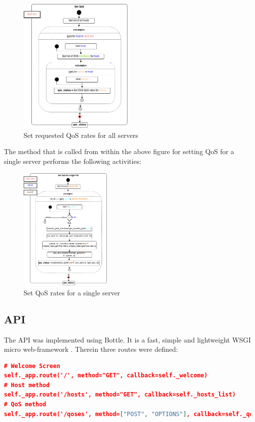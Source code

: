 \begin{figure}[H]
\centering

\includegraphics[width=0.5\textwidth]{images/implementation/cma_set_qos}

\caption{Set requested QoS rates for all servers}
\end{figure}

The method that is called from within the above figure for setting QoS for a single server performs the following activities:

\begin{figure}[H]
\centering

\includegraphics[width=0.4\textwidth]{images/implementation/cma_set_qos_single_server}

\caption{Set QoS rates for a single server}
\end{figure}

\subsection{API}

The API was implemented using Bottle. It is a fast, simple and lightweight WSGI micro web-framework \cite{bottle-docs}. Therein three routes were defined:
\begin{lstlisting}[language=json]
# Welcome Screen
self._app.route('/', method="GET", callback=self._welcome)
# Host method
self._app.route('/hosts', method="GET", callback=self._hosts_list)
# QoS method
self._app.route('/qoses', method=["POST", "OPTIONS"], callback=self._qoses_set)
\end{lstlisting}

